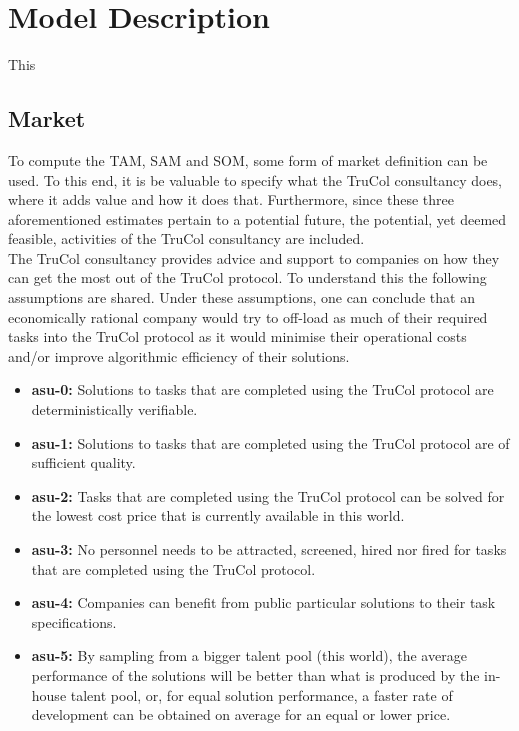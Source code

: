 \section{Model Description}\label{sec:model_description}
This


\subsection{Market}\label{subsec:model_description_market}
To compute the TAM, SAM and SOM, some form of market definition can be used. To this end, it is be valuable to specify what the TruCol consultancy does, where it adds value and how it does that. Furthermore, since these three aforementioned estimates pertain to a potential future, the potential, yet deemed feasible, activities of the TruCol consultancy are included.
\\
The TruCol consultancy provides advice and support to companies on how they can get the most out of the TruCol protocol. To understand this the following assumptions are shared. Under these assumptions, one can conclude that an economically rational company would try to off-load as much of their required tasks into the TruCol protocol as it would minimise their operational costs and/or improve algorithmic efficiency of their solutions. 

\begin{itemize}
	\item \textbf{asu-0:} Solutions to tasks that are completed using the TruCol protocol are deterministically verifiable.
	\item \textbf{asu-1:} Solutions to tasks that are completed using the TruCol protocol are of sufficient quality.
	\item \textbf{asu-2:} Tasks that are completed using the TruCol protocol can be solved for the lowest cost price that is currently available in this world.
	\item \textbf{asu-3:} No personnel needs to be attracted, screened, hired nor fired for tasks that are completed using the TruCol protocol.
	\item \textbf{asu-4:} Companies can benefit from public particular solutions to their task specifications. 
	\item \textbf{asu-5:} By sampling from a bigger talent pool (this world), the average performance of the solutions will be better than what is produced by the in-house talent pool, or, for equal solution performance, a faster rate of development can be obtained on average for an equal or lower price.
\end{itemize}



